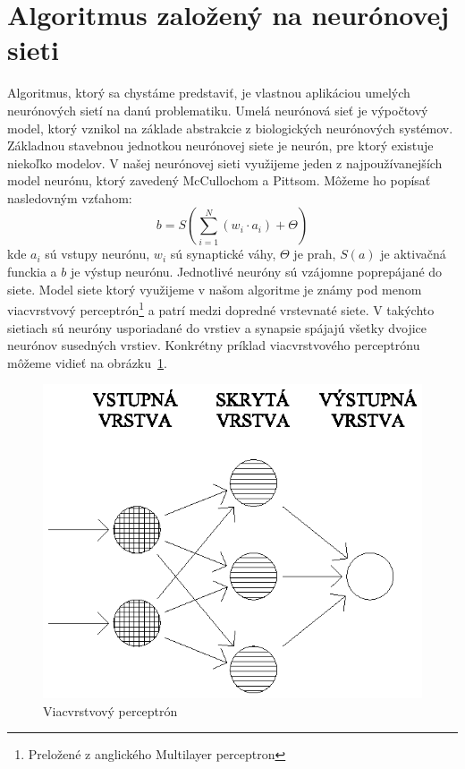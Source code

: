 \section{Algoritmus založený na neurónovej sieti}
Algoritmus, ktorý sa chystáme predstaviť, je vlastnou aplikáciou umelých neurónových sietí na danú problematiku. Umelá neurónová sieť je výpočtový model, ktorý vznikol na základe abstrakcie z biologických neurónových systémov. Základnou stavebnou jednotkou neurónovej siete je neurón, pre ktorý existuje niekoľko modelov. V našej neurónovej sieti využijeme jeden z najpoužívanejších model neurónu, ktorý zavedený McCullochom a Pittsom. Môžeme ho popísať nasledovným vzťahom:
$$b = S(\sum_{i=1}^{N}(w_i \cdot a_i) + \Theta)$$
kde $a_i$ sú vstupy neurónu, $w_i$ sú synaptické váhy, $\Theta$ je prah, $S(a)$ je aktivačná funckia a $b$ je výstup neurónu.
Jednotlivé neuróny sú vzájomne poprepájané do siete. Model siete ktorý využijeme v našom algoritme je známy pod menom viacvrstvový perceptrón\footnote{Preložené z anglického Multilayer perceptron} a patrí medzi dopredné vrstevnaté siete. V takýchto sietiach sú neuróny usporiadané do vrstiev a synapsie spájajú všetky dvojice neurónov susedných vrstiev. Konkrétny príklad viacvrstvového perceptrónu môžeme vidieť na obrázku~\ref{obrazok:neuronova-siet}.

\begin{figure}[!h]
	\centering
	\includegraphics[width=1.0\textwidth]{images/siet.eps}
	\caption{Viacvrstvový perceptrón}
	\label{obrazok:neuronova-siet}
\end{figure}

